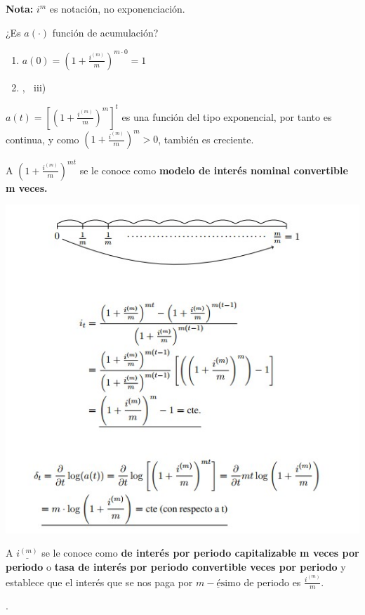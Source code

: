 \documentclass[
]{book}
\theoremstyle{definition}
\theoremstyle{definition}
\theoremstyle{definition}
\theoremstyle{definition}
\theoremstyle{remark}
\begin{document}
\textbf{Nota:} \(i^{m}\) es notación, no exponenciación.

¿Es \(a(\cdot)\) función de acumulación?

\begin{enumerate}
\def\labelenumi{\roman{enumi})}
\item
  \(a(0)=\left( 1 + \frac{i^{(m)}}{m}\right)^{m\cdot 0} = 1\)
\item
  , \(\:\) iii)
\end{enumerate}

\(a(t) =\left[ \left( 1 +\frac{i^{(m)}}{m}\right)^{m}\right]^t\) es una función del tipo exponencial, por tanto es continua, y como \(\left( 1 +\frac{i^{(m)}}{m}\right)^{m} > 0\), también es creciente.

A \(\boxed{\left( 1 + \frac{i^{(m)}}{m}\right)^{mt}}\) se le conoce como \textbf{{modelo de interés nominal convertible m veces.}}

\includegraphics{images/8.jpg}

A \(\underline{i^{(m)}}\) se le conoce como \textbf{{de interés por periodo capitalizable m veces por periodo}} o \textbf{{tasa de interés por periodo convertible veces por periodo}} y establece que el interés que se nos paga por \(\underline{m-\text{ésimo}}\) de periodo es \(\frac{i^{(m)}}{m}\).

.
\end{document}
